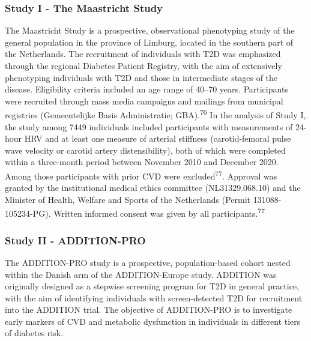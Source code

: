 \documentclass[
  a4paper,
  headsepline=true,
  open=left]{scrbook}
\begin{document}
\hypertarget{study-i---the-maastricht-study}{%
\subsubsection{Study I - The Maastricht
Study}\label{study-i---the-maastricht-study}}

The Maastricht Study is a prospective, observational phenotyping study
of the general population in the province of Limburg, located in the
southern part of the Netherlands. The recruitment of individuals with
T2D was emphasized through the regional Diabetes Patient Registry, with
the aim of extensively phenotyping individuals with T2D and those in
intermediate stages of the disease. Eligibility criteria included an age
range of 40--70 years. Participants were recruited through mass media
campaigns and mailings from municipal registries (Gemeentelijke Basis
Administratie; GBA).\textsuperscript{76} In the analysis of Study I, the
study among 7449 individuals included participants with measurements of
24-hour HRV and at least one measure of arterial stiffness
(carotid-femoral pulse wave velocity or carotid artery distensibility),
both of which were completed within a three-month period between
November 2010 and December 2020. Among those participants with prior CVD
were excluded\textsuperscript{77}. Approval was granted by the
institutional medical ethics committee (NL31329.068.10) and the Minister
of Health, Welfare and Sports of the Netherlands (Permit
131088-105234-PG). Written informed consent was given by all
participants.\textsuperscript{77}

\hypertarget{study-ii---addition-pro}{%
\subsubsection{Study II - ADDITION-PRO}\label{study-ii---addition-pro}}

The ADDITION-PRO study is a prospective, population-based cohort nested
within the Danish arm of the ADDITION-Europe study. ADDITION was
originally designed as a stepwise screening program for T2D in general
practice, with the aim of identifying individuals with screen-detected
T2D for recruitment into the ADDITION trial. The objective of
ADDITION-PRO is to investigate early markers of CVD and metabolic
dysfunction in individuals in different tiers of diabetes risk.
\end{document}
